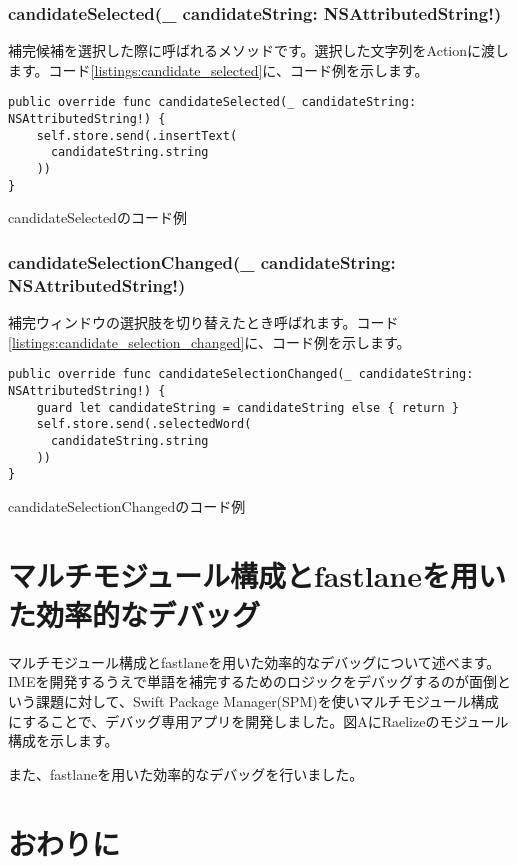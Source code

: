 \documentclass[uplatex,a4j,12pt,twocolumn]{jsarticle}
\begin{document}
\subsubsection{candidateSelected(\_ candidateString: NSAttributedString!)}
補完候補を選択した際に呼ばれるメソッドです。選択した文字列をActionに渡します。コード\ref{listings:candidate_selected}に、コード例を示します。
\begin{listing}[h]
  \begin{verbatim}
public override func candidateSelected(_ candidateString: NSAttributedString!) {
    self.store.send(.insertText(
      candidateString.string
    ))
}
  \end{verbatim}
  \caption{candidateSelectedのコード例}\label{listings:candidate_selected}
\end{listing}

\subsubsection{candidateSelectionChanged(\_ candidateString: NSAttributedString!)}
補完ウィンドウの選択肢を切り替えたとき呼ばれます。コード\ref{listings:candidate_selection_changed}に、コード例を示します。
\begin{listing}[h]
  \begin{verbatim}
public override func candidateSelectionChanged(_ candidateString: NSAttributedString!) {
    guard let candidateString = candidateString else { return }
    self.store.send(.selectedWord(
      candidateString.string
    ))
}
  \end{verbatim}
  \caption{candidateSelectionChangedのコード例}\label{listings:candidate_selection_changed}
\end{listing}

\section{マルチモジュール構成とfastlaneを用いた効率的なデバッグ}\label{sec:multi_module_and_fastlane}
マルチモジュール構成とfastlaneを用いた効率的なデバッグについて述べます。IMEを開発するうえで単語を補完するためのロジックをデバッグするのが面倒という課題に対して、Swift Package Manager(SPM)を使いマルチモジュール構成にすることで、デバッグ専用アプリを開発しました。図AにRaelizeのモジュール構成を示します。


また、fastlaneを用いた効率的なデバッグを行いました。

\section{おわりに}\label{sec:conclusion}

 
 
\end{document}

